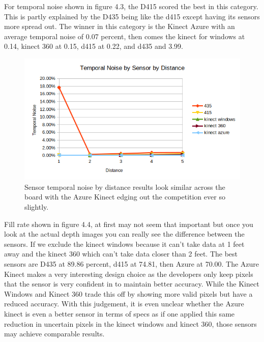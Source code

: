 For temporal noise shown in figure 4.3, the D415 scored the best in this category. This is partly explained by the D435 being like the d415 except having its sensors more spread out. The winner in this category is the Kinect Azure with an average temporal noise of 0.07 percent, then comes the kinect for windows at 0.14, kinect 360 at 0.15, d415 at 0.22, and d435 and 3.99.
\begin{figure}[!htb]
	\caption{Sensor temporal noise by distance results look similar across the board with the Azure Kinect edging out the competition ever so slightly.}
	\centering
	\includegraphics[width=1\textwidth]{images/temporal_noise.png}
\end{figure}

Fill rate shown in figure 4.4, at first may not seem that important but once you look at the actual depth images you can really see the difference between the sensors. If we exclude the kinect windows because it can't take data at 1 feet away and the kinect 360 which can't take data closer than 2 feet. The best sensors are D435 at 89.86 percent, d415 at 74.81, then Azure at 70.00. The Azure Kinect makes a very interesting design choice as the developers only keep pixels that the sensor is very confident in to maintain better accuracy. While the Kinect Windows and Kinect 360 trade this off by showing more valid pixels but have a reduced accuracy. With this judgement, it is even unclear whether the Azure kinect is even a better sensor in terms of specs as if one applied this same reduction in uncertain pixels in the kinect windows and kinect 360, those sensors may achieve comparable results.

